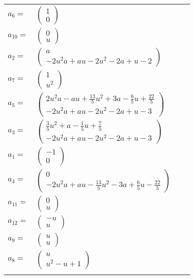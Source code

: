 \documentclass[1p]{elsarticle_modified}
\theoremstyle{definition}
\begin{document}
\begin{tabular}{m{7pt} m{180pt} m{7pt} m{180pt} }
\flushright $a_{6}=$&$\begin{pmatrix}1\\0\end{pmatrix}$ \\
\flushright $a_{10}=$&$\begin{pmatrix}0\\u\end{pmatrix}$ \\
\flushright $a_{2}=$&$\begin{pmatrix}a\\-2 u^2 a+a u-2 u^2-2 a+u-2\end{pmatrix}$ \\
\flushright $a_{7}=$&$\begin{pmatrix}1\\u^2\end{pmatrix}$ \\
\flushright $a_{5}=$&$\begin{pmatrix}2 u^2 a- a u+\frac{13}{5} u^2+3 a-\frac{6}{5} u+\frac{22}{5}\\-2 u^2 a+a u-2 u^2-2 a+u-3\end{pmatrix}$ \\
\flushright $a_{3}=$&$\begin{pmatrix}\frac{3}{5} u^2+a-\frac{1}{5} u+\frac{7}{5}\\-2 u^2 a+a u-2 u^2-2 a+u-3\end{pmatrix}$ \\
\flushright $a_{1}=$&$\begin{pmatrix}-1\\0\end{pmatrix}$ \\
\flushright $a_{4}=$&$\begin{pmatrix}0\\-2 u^2 a+a u-\frac{13}{5} u^2-3 a+\frac{6}{5} u-\frac{22}{5}\end{pmatrix}$ \\
\flushright $a_{11}=$&$\begin{pmatrix}0\\u\end{pmatrix}$ \\
\flushright $a_{12}=$&$\begin{pmatrix}- u\\u\end{pmatrix}$ \\
\flushright $a_{9}=$&$\begin{pmatrix}u\\u\end{pmatrix}$ \\
\flushright $a_{8}=$&$\begin{pmatrix}u\\u^2- u+1\end{pmatrix}$\\&\end{tabular}
\end{document}
